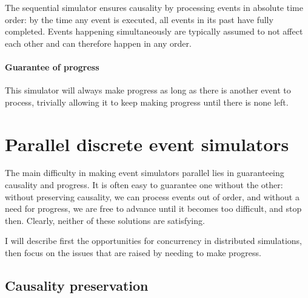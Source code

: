 The sequential simulator ensures causality by processing events in absolute time order: by the time any event is executed, all events in its past have fully completed.
Events happening simultaneously are typically assumed to not affect each other and can therefore happen in any order.

\paragraph{Guarantee of progress}
This simulator will always make progress as long as there is another event to process, trivially allowing it to keep making progress until there is none left.



\section{Parallel discrete event simulators} \label{pdes}

The main difficulty in making event simulators parallel lies in guaranteeing causality and progress. 
It is often easy to guarantee one without the other: without preserving causality, we can process events out of order, and without a need for progress, we are free to advance until it becomes too difficult, and stop then.
Clearly, neither of these solutions are satisfying.

I will describe first the opportunities for concurrency in distributed simulations, then focus on the issues that are raised by needing to make progress.

\subsection{Causality preservation} \label{causality}

